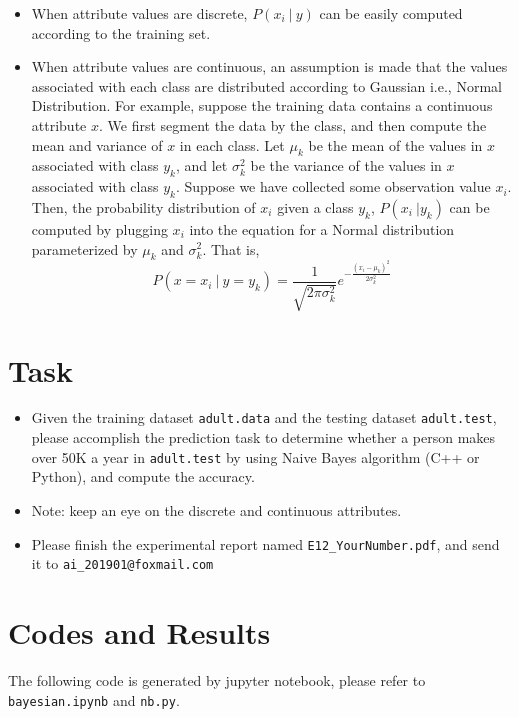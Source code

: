 \documentclass[a4paper, 11pt]{article}
\begin{document}
\begin{itemize}
	\item When attribute values are discrete, $P(x_i\ |\ y)$ can be easily computed according to the training set.
	\item When attribute values are continuous, an assumption is made that the values associated with each class are distributed according to Gaussian i.e., Normal Distribution. For example, suppose the training data contains a continuous attribute $x$. We first segment the data by the class, and then compute the mean and variance of $x$ in each class. Let $\mu_k$ be the mean of the values in $x$ associated with class $y_k$, and let $\sigma_k^2$ be the variance of the values in $x$ associated with class $y_k$. Suppose we have collected some observation value $x_i$. Then, the probability distribution of $x_i$ given a class $y_k$, $P(x_i\ | y_k)$ can be computed by plugging $x_i$ into the equation for a Normal distribution parameterized by $\mu_k$ and $\sigma_k^2$. That is,
	$$P(x=x_i\ |\ y=y_k)=\frac{1}{\sqrt{2\pi\sigma_k^2}}e^{-\frac{(x_i-\mu_k)^2}{2\sigma_k^2}}$$

\end{itemize}

\section{Task}
\begin{itemize}
\item Given the training dataset \texttt{adult.data} and the testing dataset \texttt{adult.test}, please accomplish the prediction task to determine whether a person makes over 50K a year in \texttt{adult.test} by using Naive Bayes algorithm (C++ or Python), and compute the accuracy.
\item Note: keep an eye on the discrete and continuous attributes.
\item Please finish the experimental report named \texttt{E12\_YourNumber.pdf}, and send it to \texttt{ai\_201901@foxmail.com}
\end{itemize}

\section{Codes and Results}
The following code is generated by jupyter notebook, please refer to \verb'bayesian.ipynb' and \verb'nb.py'.
\end{document}
